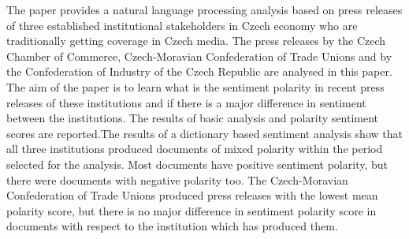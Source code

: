 
\begin{Abstrakt}
    The paper provides a natural language processing analysis based on press releases of three established  institutional stakeholders in Czech economy who are traditionally getting coverage in Czech media. The press releases by the Czech Chamber of Commerce, Czech-Moravian Confederation of Trade Unions and by the Confederation of Industry of the Czech Republic are analysed in this paper. The aim of the paper is to learn what is the sentiment polarity in recent press releases of these institutions and if there is a major difference in sentiment between the institutions. The results of basic analysis and polarity sentiment scores are reported.\newline The results of a dictionary based sentiment analysis show that all three institutions produced documents of mixed polarity within the period selected for the analysis. Most documents have positive sentiment polarity, but there were documents with negative polarity too. The Czech-Moravian Confederation of Trade Unions produced press releases with the lowest mean polarity score, but there is no major difference in sentiment polarity score in documents with respect to the institution which has produced them.
\end{Abstrakt}



\clearpage